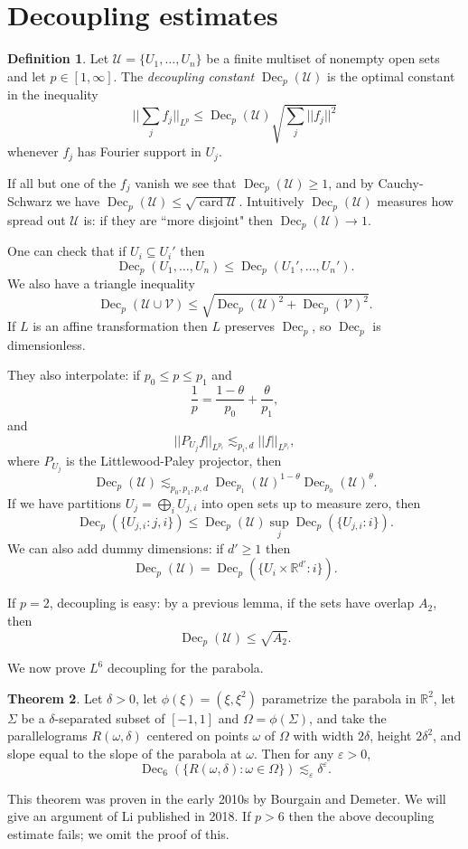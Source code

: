 \documentclass[12pt]{report}
\newcommand{\RR}{\mathbb{R}}
\newcommand{\card}{\operatorname{card}}
\newcommand{\Dec}{\operatorname{Dec}}
\newcommand{\dfn}[1]{\emph{#1}\index{#1}}
\theoremstyle{definition}
\newtheorem{theorem}{Theorem}[chapter]
\newtheorem{definition}[theorem]{Definition}
\begin{document}
\section{Decoupling estimates}
\begin{definition}
Let $\mathcal U = \{U_1, \dots, U_n\}$ be a finite multiset of nonempty open sets and let $p \in [1, \infty]$. The \dfn{decoupling constant} $\Dec_p(\mathcal U)$ is the optimal constant in the inequality
$$||\sum_j f_j||_{L^p} \leq \Dec_p(\mathcal U)\sqrt{\sum_j ||f_j||^2}$$
whenever $f_j$ has Fourier support in $U_j$.
\end{definition}
If all but one of the $f_j$ vanish we see that $\Dec_p(\mathcal U) \geq 1$, and by Cauchy-Schwarz we have $\Dec_p(\mathcal U) \leq \sqrt{\card \mathcal U}$.
Intuitively $\Dec_p(\mathcal U)$ measures how spread out $\mathcal U$ is: if they are ``more disjoint" then $\Dec_p(\mathcal U) \to 1$.

One can check that if $U_i \subseteq U_i'$ then
$$\Dec_p(U_1, \dots, U_n) \leq \Dec_p(U_1', \dots, U_n').$$
We also have a triangle inequality
$$\Dec_p(\mathcal U \cup \mathcal V) \leq \sqrt{\Dec_p(\mathcal U)^2 + \Dec_p(\mathcal V)^2}.$$
If $L$ is an affine transformation then $L$ preserves $\Dec_p$, so $\Dec_p$ is dimensionless.

They also interpolate: if $p_0 \leq p \leq p_1$ and
$$\frac{1}{p} = \frac{1-\theta}{p_0} + \frac{\theta}{p_1},$$
and
$$||P_{U_j}f||_{L^{p_i}} \lesssim_{p_i,d} ||f||_{L^{p_i}},$$
where $P_{U_j}$ is the Littlewood-Paley projector, then
$$\Dec_p(\mathcal U) \lesssim_{p_0,p_1,p,d} \Dec_{p_1}(\mathcal U)^{1-\theta}\Dec_{p_0}(\mathcal U)^\theta.$$
If we have partitions $U_j = \bigoplus_i U_{j,i}$ into open sets up to measure zero, then
$$\Dec_p(\{U_{j,i}: j,i\}) \leq \Dec_p(\mathcal U)\sup_j \Dec_p(\{U_{j,i}:i\}).$$
We can also add dummy dimensions: if $d' \geq 1$ then
$$\Dec_p(\mathcal U) = \Dec_p(\{U_i \times \RR^{d'}: i\}).$$

If $p = 2$, decoupling is easy: by a previous lemma, if the sets have overlap $A_2$, then
$$\Dec_p(\mathcal U) \leq \sqrt{A_2}.$$

We now prove $L^6$ decoupling for the parabola.
\begin{theorem}
Let $\delta > 0$, let $\phi(\xi) = (\xi, \xi^2)$ parametrize the parabola in $\RR^2$, let $\Sigma$ be a $\delta$-separated subset of $[-1, 1]$ and $\Omega = \phi(\Sigma)$, and take the parallelograms $R(\omega, \delta)$ centered on points $\omega$ of $\Omega$ with width $2\delta$, height $2\delta^2$,
and slope equal to the slope of the parabola at $\omega$. Then for any $\varepsilon > 0$,
$$\Dec_6(\{R(\omega, \delta): \omega \in \Omega\}) \lesssim_\varepsilon \delta^\varepsilon.$$
\end{theorem}
This theorem was proven in the early 2010s by Bourgain and Demeter. We will give an argument of Li published in 2018.
If $p > 6$ then the above decoupling estimate fails; we omit the proof of this.
\end{document}
